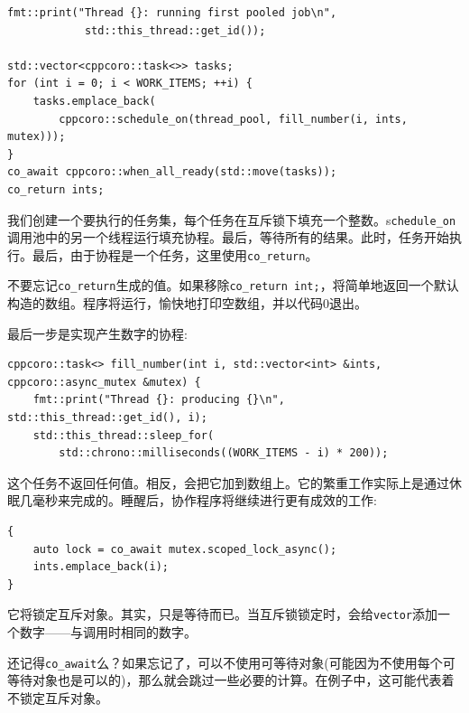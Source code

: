 \begin{lstlisting}[style=styleCXX]
fmt::print("Thread {}: running first pooled job\n",
			std::this_thread::get_id());
			
std::vector<cppcoro::task<>> tasks;
for (int i = 0; i < WORK_ITEMS; ++i) {
	tasks.emplace_back(
		cppcoro::schedule_on(thread_pool, fill_number(i, ints, mutex)));
}
co_await cppcoro::when_all_ready(std::move(tasks));
co_return ints;
\end{lstlisting}

我们创建一个要执行的任务集，每个任务在互斥锁下填充一个整数。s\texttt{chedule\_on}调用池中的另一个线程运行填充协程。最后，等待所有的结果。此时，任务开始执行。最后，由于协程是一个任务，这里使用\texttt{co\_return}。

\begin{tcolorbox}[colback=blue!5!white,colframe=blue!75!black, title=Note]
\hspace*{0.7cm}不要忘记\texttt{co\_return}生成的值。如果移除\texttt{co\_return int;}，将简单地返回一个默认构造的数组。程序将运行，愉快地打印空数组，并以代码0退出。
\end{tcolorbox}

最后一步是实现产生数字的协程:

\begin{lstlisting}[style=styleCXX]
cppcoro::task<> fill_number(int i, std::vector<int> &ints,
cppcoro::async_mutex &mutex) {
	fmt::print("Thread {}: producing {}\n", std::this_thread::get_id(), i);
	std::this_thread::sleep_for(
		std::chrono::milliseconds((WORK_ITEMS - i) * 200));
\end{lstlisting}

这个任务不返回任何值。相反，会把它加到数组上。它的繁重工作实际上是通过休眠几毫秒来完成的。睡醒后，协作程序将继续进行更有成效的工作:

\begin{lstlisting}[style=styleCXX]
{
	auto lock = co_await mutex.scoped_lock_async();
	ints.emplace_back(i);
}
\end{lstlisting}

它将锁定互斥对象。其实，只是等待而已。当互斥锁锁定时，会给\texttt{vector}添加一个数字——与调用时相同的数字。

\begin{tcolorbox}[colback=blue!5!white,colframe=blue!75!black, title=Note]
\hspace*{0.7cm}还记得\texttt{co\_await}么？如果忘记了，可以不使用可等待对象(可能因为不使用每个可等待对象也是可以的)，那么就会跳过一些必要的计算。在例子中，这可能代表着不锁定互斥对象。
\end{tcolorbox}

